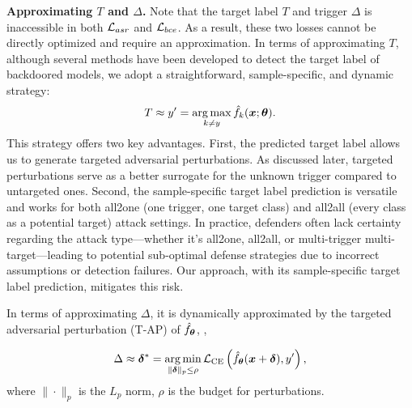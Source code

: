\noindent \textbf{Approximating \(T\) and $\Delta$.}
Note that the target label \(T\) and trigger \(\Delta\) is inaccessible in both \(\mathcal{L}_{asr}\) and \(\mathcal{L}_{bce}\). As a result, these two losses cannot be directly optimized and require an approximation. In terms of approximating \(T\),  although several methods \cite{ma2022beatrix,guo2021aeva} have been developed to detect the target label of backdoored models, we adopt a straightforward, sample-specific, and dynamic strategy: 
\begin{equation}
    T\approx y' = \operatorname*{arg\,max}_{k\neq y} \hat{f}_k(\bm{x};\bm{\theta}).
    \label{eq:label}
\end{equation}
This strategy offers two key advantages. First, the predicted target label allows us to generate targeted adversarial perturbations. As discussed later, targeted perturbations serve as a better surrogate for the unknown trigger compared to untargeted ones. Second, the sample-specific target label prediction is versatile and works for both all2one (one trigger, one target class) and all2all (every class as a potential target) attack settings. In practice, defenders often lack certainty regarding the attack type—whether it’s all2one, all2all, or multi-trigger multi-target—leading to potential sub-optimal defense strategies due to incorrect assumptions or detection failures. Our approach, with its sample-specific target label prediction, mitigates this risk.

In terms of approximating \(\Delta\), it is dynamically approximated by the targeted adversarial perturbation (T-AP) \cite{madry2017towards} of \(\hat{f}_{\bm{\theta}}\), \ie, 

\begin{equation}\label{eq:at}
\Delta \approx \bm{\delta}^* = \operatorname*{arg\,min}_{\|\bm{\delta}\|_p\leq \rho} \mathcal{L}_{\text{CE}}\left(\hat{f}_{\bm{\theta}}(\bm{x}+\bm{\delta}), y'\right),
\end{equation}
where $\|\cdot\|_p$ is the $L_p$ norm, $\rho$ is the budget for perturbations.
  

